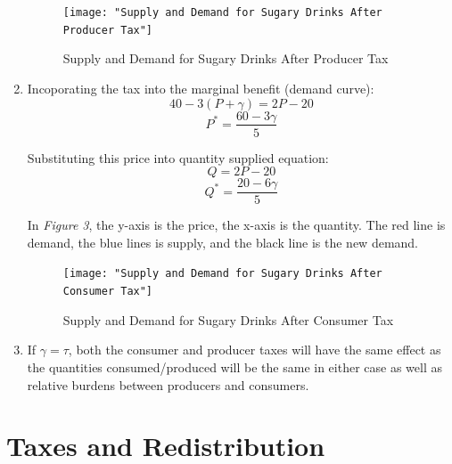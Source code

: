 \documentclass{article}
\begin{document}
\begin{enumerate}[1.]
        \begin{figure}[H]
            \centering
            \texttt{[image: "Supply and Demand for Sugary Drinks
            After Producer Tax"]}
            \caption{Supply and Demand for Sugary Drinks After Producer Tax}
        \end{figure}

    \item Incoporating the tax into the marginal benefit (demand curve):
        $$ 40 - 3 ( P + \gamma ) = 2P - 20 $$
        $$ P^{*} = \frac{ 60 - 3\gamma }{ 5 } $$

        Substituting this price into quantity supplied equation:
        $$ Q = 2P - 20 $$
        $$ Q^{*} =  \frac{ 20 - 6\gamma }{ 5 }$$

        In \textit{Figure 3}, the y-axis is the price, the x-axis is the
        quantity. The red line is demand, the blue lines is supply, and the
        black line is the new demand.

        \begin{figure}[H]
            \centering
            \texttt{[image: "Supply and Demand for Sugary Drinks
            After Consumer Tax"]}
            \caption{Supply and Demand for Sugary Drinks After Consumer Tax}
        \end{figure}

    \item If $\gamma = \tau$, both the consumer and producer taxes will have the
        same effect as the quantities consumed/produced will be the same in
        either case as well as relative burdens between producers and consumers.

\end{enumerate}

\section{ Taxes and Redistribution }
\end{document}
